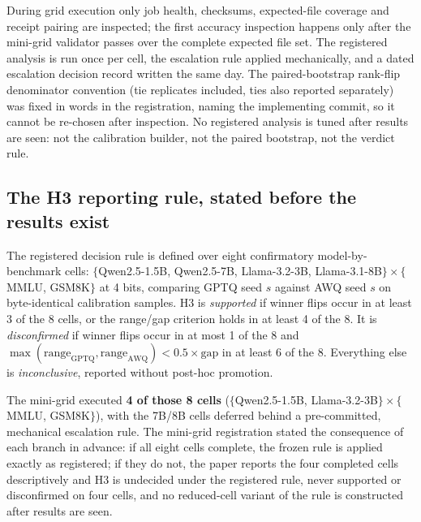 During grid execution only job health, checksums, expected-file coverage and
receipt pairing are inspected; the first accuracy inspection happens only after
the mini-grid validator passes over the complete expected file set. The
registered analysis is run once per cell, the escalation rule applied
mechanically, and a dated escalation decision record written the same day. The
paired-bootstrap rank-flip denominator convention (tie replicates included,
ties also reported separately) was fixed in words in the registration, naming
the implementing commit, so it cannot be re-chosen after inspection. No
registered analysis is tuned after results are seen: not the calibration
builder, not the paired bootstrap, not the verdict rule.

\subsection{The H3 reporting rule, stated before the results exist}
\label{app:prereg:h3rule}

The registered decision rule is defined over eight confirmatory
model-by-benchmark cells:
$\{$Qwen2.5-1.5B, Qwen2.5-7B, Llama-3.2-3B, Llama-3.1-8B$\}
\times \{$MMLU, GSM8K$\}$ at 4 bits, comparing GPTQ seed $s$ against AWQ
seed $s$ on byte-identical calibration samples. H3 is \emph{supported} if winner
flips occur in at least 3 of the 8 cells, or the range/gap criterion holds in at
least 4 of the 8. It is \emph{disconfirmed} if winner flips occur in at most 1
of the 8 and $\max(\mathrm{range}_{\mathrm{GPTQ}}, \mathrm{range}_{\mathrm{AWQ}})
< 0.5 \times \mathrm{gap}$ in at least 6 of the 8. Everything else is
\emph{inconclusive}, reported without post-hoc promotion.

The mini-grid executed \textbf{4 of those 8 cells}
($\{$Qwen2.5-1.5B, Llama-3.2-3B$\} \times \{$MMLU, GSM8K$\}$), with the 7B/8B
cells deferred behind a pre-committed, mechanical escalation rule. The mini-grid
registration stated the consequence of each branch in advance: if all eight
cells complete, the frozen rule is applied exactly as registered; if they do
not, the paper reports the four completed cells descriptively and H3 is
undecided under the registered rule, never supported or disconfirmed on four
cells, and no reduced-cell variant of the rule is constructed after results are
seen.

